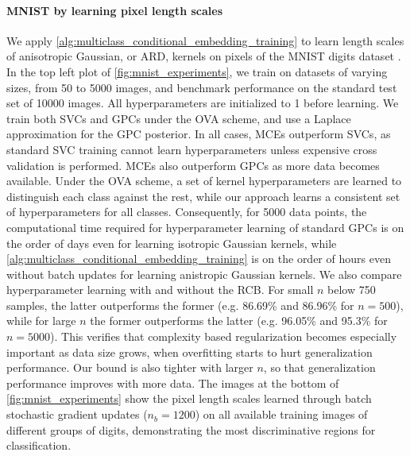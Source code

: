 \documentclass[twoside]{article}
\begin{document}
	\paragraph{MNIST by learning pixel length scales}
	
		We apply \cref{alg:multiclass_conditional_embedding_training} to learn length scales of anisotropic Gaussian, or \gls{ARD}, kernels on pixels of the MNIST digits dataset \citep{lecun1998gradient}. In the top left plot of \cref{fig:mnist_experiments}, we train on datasets of varying sizes, from 50 to 5000 images, and benchmark performance on the standard test set of 10000 images. All hyperparameters are initialized to 1 before learning. We train both \glspl{SVC} and \glspl{GPC} under the \gls{OVA} scheme, and use a Laplace approximation for the \gls{GPC} posterior. In all cases, \glspl{MCE} outperform \glspl{SVC}, as standard \gls{SVC} training cannot learn hyperparameters unless expensive cross validation is performed. \glspl{MCE} also outperform \glspl{GPC} as more data becomes available. Under the \gls{OVA} scheme, a set of kernel hyperparameters are learned to distinguish each class against the rest, while our approach learns a consistent set of hyperparameters for all classes. Consequently, for 5000 data points, the computational time required for hyperparameter learning of standard \glspl{GPC} is on the order of days even for learning isotropic Gaussian kernels, while \cref{alg:multiclass_conditional_embedding_training} is on the order of hours even without batch updates for learning anistropic Gaussian kernels. We also compare hyperparameter learning with and without the \gls{RCB}. For small $n$ below 750 samples, the latter outperforms the former (e.g. 86.69\% and 86.96\% for $n = 500$), while for large $n$ the former outperforms the latter (e.g. 96.05\% and 95.3\% for $n= 5000$). This verifies that complexity based regularization becomes especially important as data size grows, when overfitting starts to hurt generalization performance. Our bound is also tighter with larger $n$, so that generalization performance improves with more data. The images at the bottom of \cref{fig:mnist_experiments} show the pixel length scales learned through batch stochastic gradient updates ($n_{b} = 1200$) on all available training images of different groups of digits, demonstrating the most discriminative regions for classification. %
	
\end{document}

